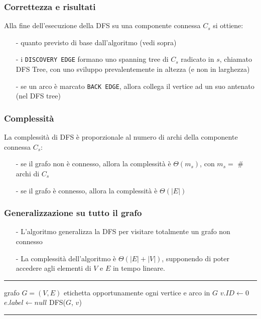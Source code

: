 \documentclass[a4paper]{article}
\makeatletter
\newenvironment{algo}[4]{
	\noindent\rule{\textwidth}{0.4pt}
	\begin{algorithmic}[1]
		\addtocounter{ALG@line}{-1}
		\Procedure{#1}{#2}
		\Require #3
		\Ensure #4
		\Statex }{
		\EndProcedure
	\end{algorithmic}
	\rule{\textwidth}{0.4pt}}
\makeatother
\begin{document}
\subsubsection*{Correttezza e risultati}
Alla fine dell'esecuzione della DFS su una componente connessa \(C_s\) si ottiene:
\begin{itemize}[topsep=3pt, itemsep=0pt]
	\item[-] quanto previsto di base dall'algoritmo (vedi sopra)
	\item[-] i \verb|DISCOVERY EDGE| formano uno spanning tree di \(C_s\) radicato in \(s\), chiamato DFS Tree, con uno sviluppo
	prevalentemente in altezza (e non in larghezza)
	\item[-] se un arco è marcato \verb|BACK EDGE|, allora collega il vertice ad un suo antenato (nel DFS tree)
\end{itemize}

\subsubsection*{Complessità}
La complessità di DFS è proporzionale al numero di archi della componente connessa \(C_s\):
\begin{itemize}[topsep=3pt, itemsep=0pt]
	\item[-] se il grafo non è connesso, allora la complessità è \(\Theta(m_s)\), con \(m_s = \) \# archi di \(C_s\)
	\item[-] se il grafo è connesso, allora la complessità è \(\Theta(|E|)\)
\end{itemize}

\newpage

\subsubsection*{Generalizzazione su tutto il grafo}
\begin{itemize}[topsep=3pt, itemsep=0pt]
	\item[-] L'algoritmo generalizza la DFS per visitare totalmente un grafo non connesso
	\item[-] La complessità dell'algoritmo è \(\Theta(|E| + |V|)\), supponendo di poter accedere agli elementi di \(V\) e \(E\)
	in tempo lineare.
\end{itemize}
\begin{algo}{DFSComplete}{$G$}{grafo $G = (V,E)$}{etichetta opportunamente ogni vertice e arco in \(G\)}
		\State \(v.I\!D \gets 0\)
	\EndFor
		\State \(e.label \gets null\)
	\EndFor
			\State DFS(\(G\), \(v\))
		\EndIf
	\EndFor
\end{algo}
\end{document}
